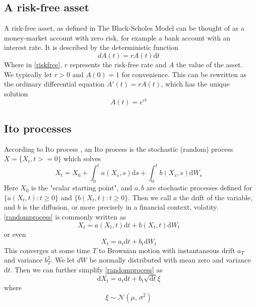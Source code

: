 \documentclass[11pt]{article} %
\begin{document}
\subsection{A risk-free asset}
A risk-free asset, as defined in The Black-Scholes Model \cite{blackscholes} can be thought
of as a money-market account with zero risk, for example a bank account with an interest 
rate. It is described by the deterministic function 
\begin{equation} \label{riskfree}
    dA(t) = rA(t)\mathrm{d}t 
\end{equation}
Where in \ref{riskfree}, $r$ represents the risk-free rate and $A$ the value of the 
asset. We typically let $r>0$ and $A(0) = 1$ for convenience. This can be rewritten as 
the ordinary differential equation $A'(t) = rA(t)$, which has the unique solution 
\begin{equation} \label{riskfree solution}
    A(t) =e^{rt}
\end{equation}
\subsection{Ito processes}

According to Ito process \cite{itoprocess}, an Ito process is the stochastic (random) 
process $X = \{X_t, t>=0\}$ which solves 
\begin{equation} \label{randomprocess}
X_t = X_0 + \int_{0}^{t} a(X_s, s)\mathrm{d}s + 
\int_{0}^{t} b(X_s, s) \mathrm{d}W_s
\end{equation}
Here $X_0$ is the "scalar starting point", and $a,b$ are stochastic 
processes defined for $\{a(X_t, t) : t\geq0\} $ and $\{b(X_t, t) : t\geq0\}$. 
Then we call $a$ the drift of the variable, and $b$ is the diffusion, 
or more precisely in a financial context, volatity. \ref{randomprocess} is commonly 
written as 
\begin{equation}
    X_t = a(X_t, t)\mathrm{d}t + b(X_t, t)\mathrm{d}W_t
\end{equation}
or even 
\begin{equation}
    X_t = a_t\mathrm{d}t + b_t\mathrm{d}W_t
\end{equation}
This converges at some time $T$ to Brownian motion with instantaneous drift $a_T$ and
variance $b_T^2$. We let $dW$ be normally distributed with mean zero and variance 
$\mathrm{d}t$. Then we can further simplify \ref{randomprocess} as 
\begin{equation}
    \mathrm{d}X_t = a_t\mathrm{d}t + b_t \sqrt{\mathrm{d}t}\xi
\end{equation}
where
\begin{equation}
    \xi \sim \mathcal{N}(\mu,\,\sigma^{2})
\end{equation}
\end{document}
